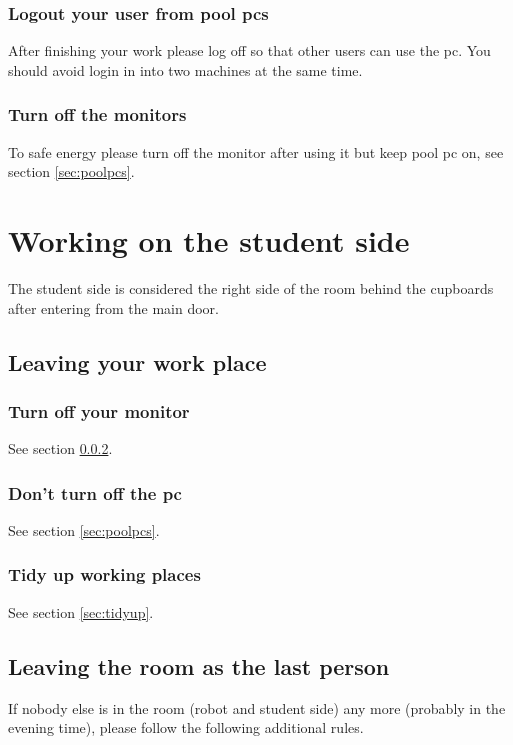 \subsubsection{Logout your user from pool pcs}
After finishing your work please log off so that other users can use the pc. You should avoid login in into two machines at the same time.

\subsubsection{Turn off the monitors}\label{sec:monitor}
To safe energy please turn off the monitor after using it but keep pool pc on, see section \ref{sec:poolpcs}.

\section{Working on the student side}
The student side is considered the right side of the room behind the cupboards after entering from the main door.

\subsection{Leaving your work place}

\subsubsection{Turn off your monitor}
See section \ref{sec:monitor}.

\subsubsection{Don't turn off the pc}
See section \ref{sec:poolpcs}.

\subsubsection{Tidy up working places}
See section \ref{sec:tidyup}.

\subsection{Leaving the room as the last person}
If nobody else is in the room (robot and student side) any more (probably in the evening time), please follow the following additional rules.


